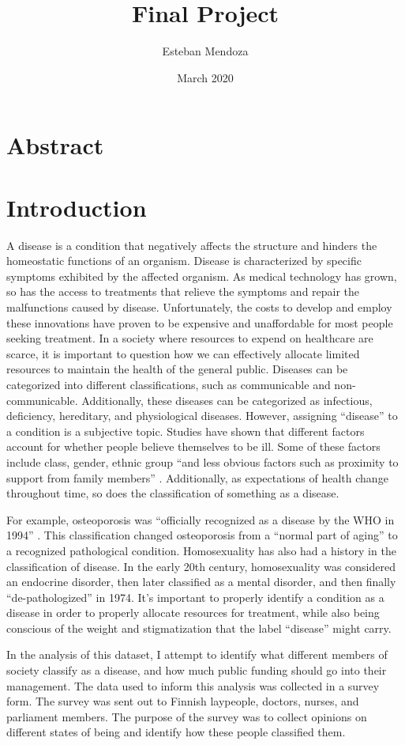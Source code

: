 \documentclass{article}
\title{Final Project}
\author{Esteban Mendoza}
\date{March 2020}
\begin{document}
\maketitle
\section{Abstract}

\newpage
\tableofcontents
\newpage


\section{Introduction}
\par A disease is a condition that negatively affects the structure and hinders the homeostatic functions of an organism. Disease is characterized by specific symptoms exhibited by the affected organism. As medical technology has grown, so has the access to treatments that relieve the symptoms and repair the malfunctions caused by disease. Unfortunately, the costs to develop and employ these innovations have proven to be expensive and unaffordable for most people seeking treatment. In a society where resources to expend on healthcare are scarce, it is important to question how we can effectively allocate limited resources to maintain the health of the general public. Diseases can be categorized into different classifications, such as communicable and non-communicable. Additionally, these diseases can be categorized as infectious, deficiency, hereditary, and physiological diseases. However, assigning “disease” to a condition is a subjective topic. Studies have shown that different factors account for whether people believe themselves to be ill. Some of these factors include class, gender, ethnic group “and less obvious factors such as proximity to support from family members” \cite{Scully2004}. Additionally, as expectations of health change throughout time, so does the classification of something as a disease. \par
For example, osteoporosis was “officially recognized as a disease by the WHO in 1994” \cite{Scully2004}. This classification changed osteoporosis from a “normal part of aging” to a recognized pathological condition. Homosexuality has also had a history in the classification of disease. In the early 20th century, homosexuality was considered an endocrine disorder, then later classified as a mental disorder, and then finally “de-pathologized” in 1974. It’s important to properly identify a condition as a disease in order to properly allocate resources for treatment, while also being conscious of the weight and stigmatization that the label “disease” might carry. \par
In the analysis of this dataset, I attempt to identify what different members of society classify as a disease, and how much public funding should go into their management. The data used to inform this analysis was collected in a survey form. The survey was sent out to Finnish laypeople, doctors, nurses, and parliament members. The purpose of the survey was to collect opinions on different states of being and identify how these people classified them.
\end{document}
